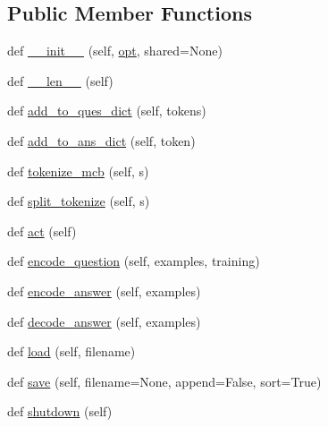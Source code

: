 \subsection*{Public Member Functions}
\begin{DoxyCompactItemize}
\item 
def \hyperlink{classparlai_1_1tasks_1_1vqa__v1_1_1agents_1_1VqaDictionaryAgent_a9da001b10c94493ab42fb7a0867afc22}{\+\_\+\+\_\+init\+\_\+\+\_\+} (self, \hyperlink{classparlai_1_1core_1_1agents_1_1Agent_ab3b45d2754244608c75d4068b90cd051}{opt}, shared=None)
\item 
def \hyperlink{classparlai_1_1tasks_1_1vqa__v1_1_1agents_1_1VqaDictionaryAgent_ab2ab51d7a69b93734e59125d85dd7b04}{\+\_\+\+\_\+len\+\_\+\+\_\+} (self)
\item 
def \hyperlink{classparlai_1_1tasks_1_1vqa__v1_1_1agents_1_1VqaDictionaryAgent_aebfab302e4b8b2b4ac74723a047cca18}{add\+\_\+to\+\_\+ques\+\_\+dict} (self, tokens)
\item 
def \hyperlink{classparlai_1_1tasks_1_1vqa__v1_1_1agents_1_1VqaDictionaryAgent_a5a69f09a3f7a908c3e89f9b0b86f7396}{add\+\_\+to\+\_\+ans\+\_\+dict} (self, token)
\item 
def \hyperlink{classparlai_1_1tasks_1_1vqa__v1_1_1agents_1_1VqaDictionaryAgent_aa4945260a8e445852d28d702346b67e2}{tokenize\+\_\+mcb} (self, s)
\item 
def \hyperlink{classparlai_1_1tasks_1_1vqa__v1_1_1agents_1_1VqaDictionaryAgent_a59f1738f5c3fdcadd0a8ece0d53c5d6e}{split\+\_\+tokenize} (self, s)
\item 
def \hyperlink{classparlai_1_1tasks_1_1vqa__v1_1_1agents_1_1VqaDictionaryAgent_af491fa3e37b0ff66ce8feb0c6ea7da16}{act} (self)
\item 
def \hyperlink{classparlai_1_1tasks_1_1vqa__v1_1_1agents_1_1VqaDictionaryAgent_af2c2144d6a142cb70d8954b00d3a3720}{encode\+\_\+question} (self, examples, training)
\item 
def \hyperlink{classparlai_1_1tasks_1_1vqa__v1_1_1agents_1_1VqaDictionaryAgent_a6e40e864eceef9b413db16c9ebb9b22b}{encode\+\_\+answer} (self, examples)
\item 
def \hyperlink{classparlai_1_1tasks_1_1vqa__v1_1_1agents_1_1VqaDictionaryAgent_a9e857a32d09fd4b4e09c80e11a1f947b}{decode\+\_\+answer} (self, examples)
\item 
def \hyperlink{classparlai_1_1tasks_1_1vqa__v1_1_1agents_1_1VqaDictionaryAgent_ac84980d21c96740bb94d4215256937ac}{load} (self, filename)
\item 
def \hyperlink{classparlai_1_1tasks_1_1vqa__v1_1_1agents_1_1VqaDictionaryAgent_ac547c4960c1f49242d42c07264d6e047}{save} (self, filename=None, append=False, sort=True)
\item 
def \hyperlink{classparlai_1_1tasks_1_1vqa__v1_1_1agents_1_1VqaDictionaryAgent_afcebdb70582204709f5e4365dde00bcb}{shutdown} (self)
\end{DoxyCompactItemize}
